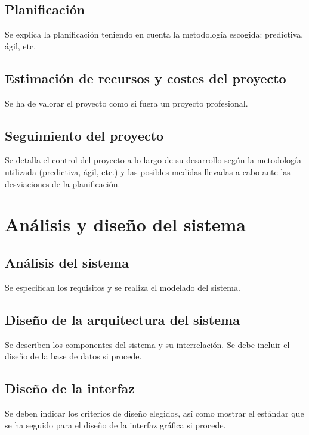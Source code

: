 \documentclass[pdftex,11pt,a4paper]{book}
\begin{document}
\section{Planificación}

Se explica la planificación teniendo en cuenta la metodología escogida: predictiva, ágil, etc.

\section{Estimación de recursos y costes del proyecto}

Se ha de valorar el proyecto como si fuera un proyecto profesional.

\section{Seguimiento del proyecto}

Se detalla el control del proyecto a lo largo de su desarrollo según la metodología utilizada (predictiva, ágil, etc.) y las posibles medidas llevadas a cabo ante las desviaciones de la planificación.

\chapter{Análisis y diseño del sistema}

\section{Análisis del sistema}

Se especifican los requisitos y se realiza el modelado del sistema.

\section{Diseño de la arquitectura del sistema}

Se describen los componentes del sistema y su interrelación. Se debe incluir el diseño de la base de datos si procede.

\section{Diseño de la interfaz}

Se deben indicar los criterios de diseño elegidos, así como mostrar el estándar que se ha seguido para el diseño de la interfaz gráfica si procede.
\end{document}
